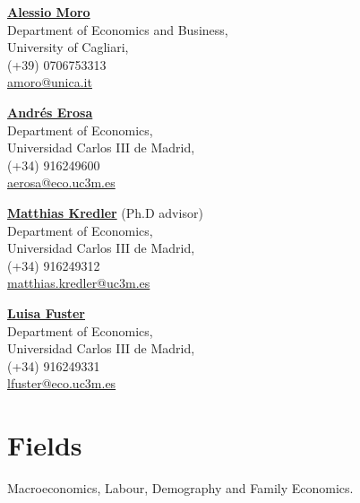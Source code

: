 \documentclass[margin]{res} %
\begin{document}
\begin{resume}
\begin{multicols}{2}
	\href{http://http://www.alessiomoro.it/}{\bf{Alessio Moro}} \\
	Department of Economics and Business, \\
	University of Cagliari, \\
	(+39) 0706753313 \\
	\href{mailto:amoro@unica.it}{amoro@unica.it}
	
	\href{http://economics.uc3m.es/personal/andres-erosa/}{\bf{Andr\'es Erosa}}  \\
	Department of Economics, \\
	Universidad Carlos III de Madrid, \\
	(+34) 916249600 \\
	\href{mailto:aerosa@eco.uc3m.es}{aerosa@eco.uc3m.es}
	
	\columnbreak
	
	\href{http://www.eco.uc3m.es/~mkredler/}{\bf{Matthias Kredler}} (Ph.D advisor)\\
	Department of Economics, \\
	Universidad Carlos III de Madrid, \\
	(+34) 916249312 \\
	\href{mailto:matthias.kredler@uc3m.es}{matthias.kredler@uc3m.es}
	
	\href{http://economics.uc3m.es/personal/luisa-fuster/}{\bf{Luisa Fuster}} \\
	Department of Economics, \\
	Universidad Carlos III de Madrid, \\
	(+34) 916249331 \\
	\href{mailto:lfuster@eco.uc3m.es}{lfuster@eco.uc3m.es}
	
\end{multicols}

\section{Fields}

Macroeconomics, Labour, Demography and Family Economics.


\end{resume}
\end{document}
